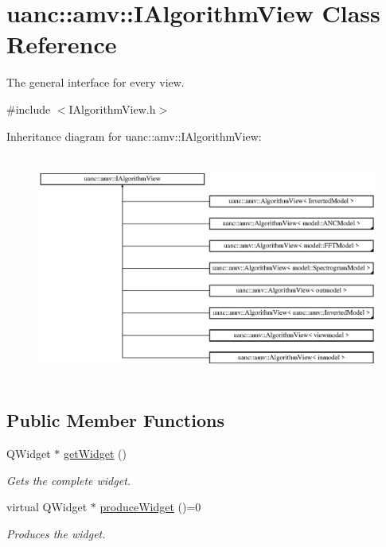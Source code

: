 \hypertarget{classuanc_1_1amv_1_1_i_algorithm_view}{}\section{uanc\+:\+:amv\+:\+:I\+Algorithm\+View Class Reference}
\label{classuanc_1_1amv_1_1_i_algorithm_view}


The general interface for every view.  




{\ttfamily \#include $<$I\+Algorithm\+View.\+h$>$}

Inheritance diagram for uanc\+:\+:amv\+:\+:I\+Algorithm\+View\+:\begin{figure}[H]
\begin{center}
\leavevmode
\includegraphics[height=7.544909cm]{classuanc_1_1amv_1_1_i_algorithm_view}
\end{center}
\end{figure}
\subsection*{Public Member Functions}
\begin{DoxyCompactItemize}
\item 
Q\+Widget $\ast$ \hyperlink{classuanc_1_1amv_1_1_i_algorithm_view_ad477f4e62bb8c2ae78fd010cba1628cb}{get\+Widget} ()
\begin{DoxyCompactList}\small\item\em Gets the complete widget. \end{DoxyCompactList}\item 
virtual Q\+Widget $\ast$ \hyperlink{classuanc_1_1amv_1_1_i_algorithm_view_ab9d06a0b43db57244868f10dae8e09e5}{produce\+Widget} ()=0
\begin{DoxyCompactList}\small\item\em Produces the widget. \end{DoxyCompactList}\end{DoxyCompactItemize}


